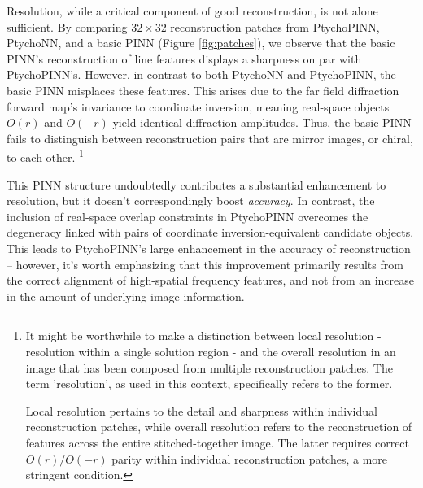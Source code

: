 \documentclass[sn-mathphys]{sn-jnl}%
\theoremstyle{thmstyleone}%
\theoremstyle{thmstyletwo}%
\theoremstyle{thmstylethree}%
\begin{document}
Resolution, while a critical component of good reconstruction, is not alone sufficient. By comparing $32 \times 32$ reconstruction patches from PtychoPINN, PtychoNN, and a basic PINN (Figure \ref{fig:patches}), we observe that the basic PINN's reconstruction of line features displays a sharpness on par with PtychoPINN's. However, in contrast to both PtychoNN and PtychoPINN, the basic PINN misplaces these features. This arises due to the far field diffraction forward map's invariance to coordinate inversion, meaning real-space objects $O(r)$ and $O(-r)$ yield identical diffraction amplitudes. Thus, the basic PINN fails to distinguish between reconstruction pairs that are mirror images, or chiral, to each other.
\footnote{It might be worthwhile to make a distinction between local resolution - resolution within a single solution region - and the overall resolution in an image that has been composed from multiple reconstruction patches. The term 'resolution', as used in this context, specifically refers to the former.

Local resolution pertains to the detail and sharpness within individual reconstruction patches, while overall resolution refers to the reconstruction of features across the entire stitched-together image. The latter requires correct $O(r) / O(-r)$ parity within individual reconstruction patches, a more stringent condition.}

This PINN structure undoubtedly contributes a substantial enhancement to resolution, but it doesn't correspondingly boost \emph{accuracy}. In contrast, the inclusion of real-space overlap constraints in PtychoPINN overcomes the degeneracy linked with pairs of coordinate inversion-equivalent candidate objects. This leads to PtychoPINN's large enhancement in the accuracy of reconstruction -- however, it's worth emphasizing that this improvement primarily results from the correct alignment of high-spatial frequency features, and not from an increase in the amount of underlying image information.
\end{document}

